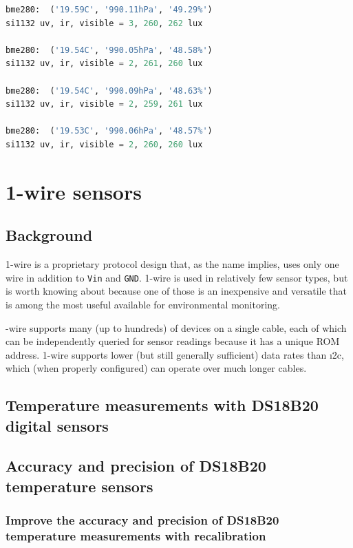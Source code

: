 \begin{enumerate}
\begin{lstlisting}[language=Python]
bme280:  ('19.59C', '990.11hPa', '49.29%')
si1132 uv, ir, visible = 3, 260, 262 lux

bme280:  ('19.54C', '990.05hPa', '48.58%')
si1132 uv, ir, visible = 2, 261, 260 lux

bme280:  ('19.54C', '990.09hPa', '48.63%')
si1132 uv, ir, visible = 2, 259, 261 lux

bme280:  ('19.53C', '990.06hPa', '48.57%')
si1132 uv, ir, visible = 2, 260, 260 lux
\end{lstlisting}

\end{enumerate}

\section{\color{gray}1-wire sensors \color{black}}
\subsection{\color{gray} Background \color{black}}
1-wire is a proprietary protocol design that, as the name implies, uses only one wire in addition to \texttt{Vin} and \texttt{GND}.
1-wire is used in relatively few sensor types, but is worth knowing about because one of those is an inexpensive and versatile  that is among the most useful available for environmental monitoring.

-wire supports many (up to hundreds) of devices on a single cable, each of which can be independently queried for sensor readings because it has a unique ROM address.
1-wire supports lower (but still generally sufficient) data rates than \i2c, which (when properly configured) can operate over much longer cables.

\subsection{\color{gray} Temperature measurements with DS18B20 digital sensors \color{black}}
\subsection{\color{gray} Accuracy and precision of DS18B20 temperature sensors \color{black}}
\subsubsection{\color{gray} Improve the accuracy and precision of DS18B20 temperature measurements with recalibration \color{black}}
